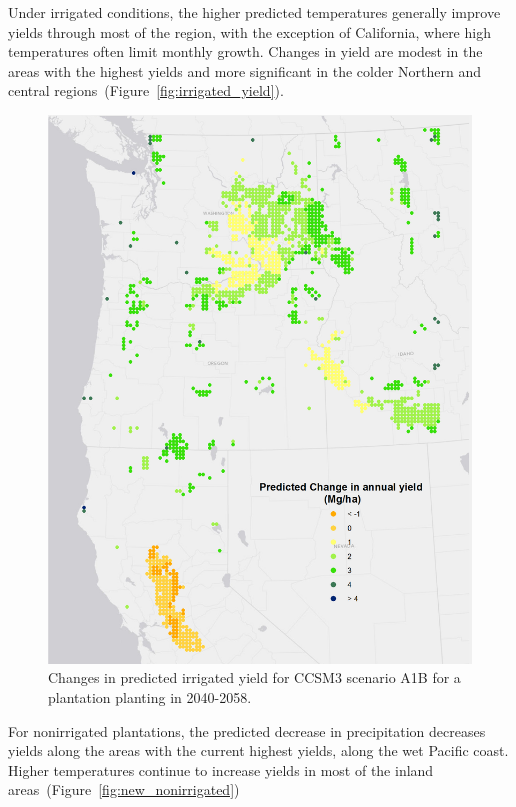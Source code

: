 \documentclass[preprint,12pt]{elsarticle}
\begin{document}
Under irrigated conditions, the higher predicted temperatures
generally improve yields through most of the region, with the
exception of California, where high temperatures often limit monthly
growth.  Changes in yield are modest in the areas with the highest
yields and more significant in the colder Northern and central
regions~(Figure~\ref{fig:irrigated_yield}).
 
\begin{figure}[hp]
  \centering
  \includegraphics[width=1\linewidth]{climate_irrigated}
  \caption{Changes in predicted irrigated yield for \ac{CCSM3} scenario A1B
    for a plantation planting in 2040-2058.}
  \label{fig:new_irrigated}
\end{figure}

For nonirrigated plantations, the predicted decrease in precipitation
decreases yields along the areas with the current highest yields,
along the wet Pacific coast.  Higher temperatures continue to increase
yields in most of the inland areas~(Figure~\ref{fig:new_nonirrigated})
\end{document}
